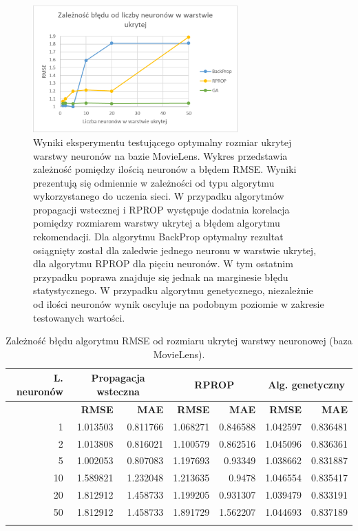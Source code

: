 \documentclass[twoside]{iisthesis}
\begin{document}
			\begin{figure}[H]
				\centering
				\includegraphics[width=0.7\textwidth]{exphiddenneural}
				\caption{Wyniki eksperymentu testującego optymalny rozmiar ukrytej warstwy neuronów na bazie MovieLens. Wykres przedstawia zależność pomiędzy ilością neuronów a błędem RMSE. Wyniki prezentują się odmiennie w zależności od typu algorytmu wykorzystanego do uczenia sieci. W przypadku algorytmów propagacji wstecznej i RPROP występuje dodatnia korelacja pomiędzy rozmiarem warstwy ukrytej a błędem algorytmu rekomendacji. Dla algorytmu BackProp optymalny rezultat osiągnięty został dla zaledwie jednego neuronu w warstwie ukrytej, dla algorytmu RPROP dla pięciu neuronów. W tym ostatnim przypadku poprawa znajduje się jednak na marginesie błędu statystycznego. W przypadku algorytmu genetycznego, niezależnie od ilości neuronów wynik oscyluje na podobnym poziomie w zakresie testowanych wartości.}
				\label{fig:exphiddenneural}
			\end{figure}
			
			\begin{longtable}{r||rr|rr|rr}
				\label{tab:exphiddenneural}
				\centering
				\textbf{L. neuronów} &  \multicolumn{2}{c|}{\textbf{Propagacja wsteczna}}  & \multicolumn{2}{c|}{\textbf{RPROP}} & \multicolumn{2}{c}{\textbf{Alg. genetyczny}}  \\
				\hline
				& \textbf{RMSE} & \textbf{MAE} & \textbf{RMSE} & \textbf{MAE} & \textbf{RMSE} & \textbf{MAE} \\
				\hline
				1                                   & 1.013503                          & 0.811766 & 1.068271 & 0.846588 & 1.042597 & 0.836481 \\
				2                                   & 1.013808                          & 0.816021 & 1.100579 & 0.862516 & 1.045096 & 0.836361 \\
				5                                   & 1.002053                          & 0.807083 & 1.197693 & 0.93349  & 1.038662 & 0.831887 \\
				10                                  & 1.589821                          & 1.232048 & 1.213635 & 0.9478   & 1.046554 & 0.835417 \\
				20                                  & 1.812912                          & 1.458733 & 1.199205 & 0.931307 & 1.039479 & 0.833191 \\
				50                                  & 1.812912                          & 1.458733 & 1.891729 & 1.562207 & 1.044693 & 0.837189\\		
				\caption{Zależność błędu algorytmu RMSE od rozmiaru ukrytej warstwy neuronowej (baza MovieLens).}
			\end{longtable}
		
\end{document}
